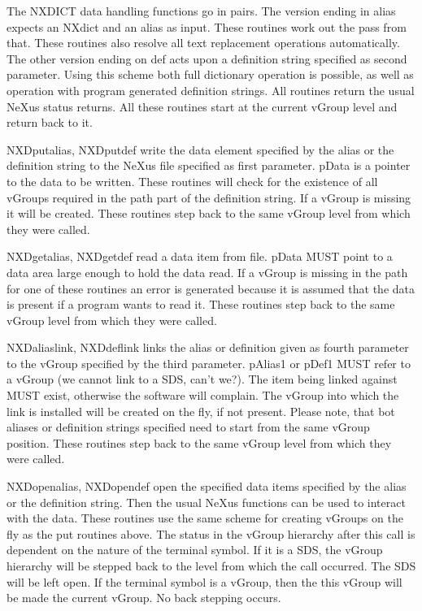 \documentclass[12pt]{article}
\begin{document}
The NXDICT data handling functions go in pairs. The version ending in
 alias expects an NXdict and an alias as input. These routines work
 out the pass from that. These routines also resolve all text replacement 
 operations automatically. The other version ending on def acts upon 
 a definition string specified as second parameter. Using this scheme
 both full dictionary operation is possible, as well as operation with
 program generated definition strings. All routines return the
 usual NeXus status returns. All these routines start at the current vGroup
 level and return back to it.  

 NXDputalias, NXDputdef write the data element specified by the alias or
 the definition string to the NeXus file specified as first parameter. 
 pData is a pointer to the data to be written. These routines will check for
 the existence of all vGroups required in the path part of the definition
 string. If a vGroup  is missing it will be created. These routines step
 back to the same vGroup level from which they were called.

 NXDgetalias, NXDgetdef read a data item from file. pData MUST point to a
 data area large enough to hold the data read. If a vGroup is missing in
 the path for one of these routines an error is generated because it is 
 assumed that the data is present if a program wants to read it. These 
 routines step
 back to the same vGroup level from which they were called.
 
 NXDaliaslink, NXDdeflink links the alias or definition given as fourth
 parameter to the vGroup specified by the  third parameter. pAlias1 or
 pDef1 MUST refer to a vGroup (we cannot link to a SDS, can't we?). The
 item being linked against MUST exist, otherwise the software will complain.
 The vGroup into which the link is installed will be created on the fly,
 if not present.
 Please note, that bot aliases or definition strings specified need to
 start from the same vGroup position.  These routines step
 back to the same vGroup level from which they were called. 

 NXDopenalias, NXDopendef open the specified data items specified by the
 alias or the definition string. Then the usual NeXus functions can be 
 used to interact with the data. These routines use the same scheme for
 creating vGroups on the fly as the put routines above. The status in the
 vGroup hierarchy after this call is dependent on the nature of the terminal
 symbol. If it is a SDS, the vGroup hierarchy will be stepped back to the
 level from which the call occurred. The SDS will be left open. If the
 terminal symbol is a vGroup, then the this vGroup will be made the current
 vGroup. No back stepping occurs. 
\end{document}
